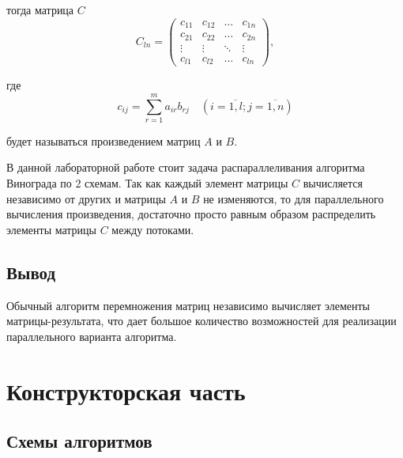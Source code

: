 \documentclass[12pt]{report}
\begin{document}
тогда матрица $C$
\begin{equation}
C_{ln} = \begin{pmatrix}
c_{11} & c_{12} & \ldots & c_{1n}\\
c_{21} & c_{22} & \ldots & c_{2n}\\
\vdots & \vdots & \ddots & \vdots\\
c_{l1} & c_{l2} & \ldots & c_{ln}
\end{pmatrix},
\end{equation}

где
\begin{equation}
\label{eq:M}
c_{ij} =
\sum_{r=1}^{m} a_{ir}b_{rj} \quad (i=\overline{1,l}; j=\overline{1,n})
\end{equation}

будет называться произведением матриц $A$ и $B$.


В данной лабораторной работе стоит задача распараллеливания алгоритма Винограда по 2 схемам. Так как каждый элемент матрицы $C$ вычисляется независимо от других и матрицы $A$ и $B$ не изменяются, то для параллельного вычисления произведения, достаточно просто равным образом распределить элементы матрицы $C$ между потоками.



\section{Вывод}
	Обычный алгоритм перемножения матриц независимо вычисляет элементы матрицы-результата, что дает большое количество возможностей для реализации параллельного варианта алгоритма.
\clearpage

\chapter{Конструкторская часть}

\section{Схемы алгоритмов}
\end{document}
